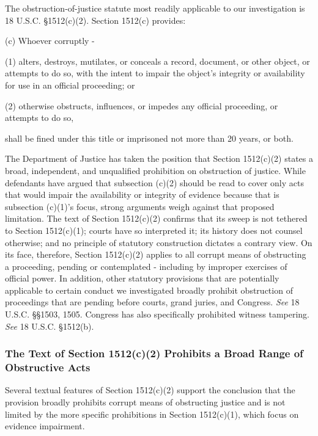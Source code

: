 The obstruction-of-justice statute most readily applicable to our investigation is 18 U.S.C. \S 1512(c)(2). Section 1512(c) provides:

(c) Whoever corruptly -

(1) alters, destroys, mutilates, or conceals a record, document, or other object, or attempts to do so, with the intent to impair the object’s integrity or availability for use in an official proceeding; or

(2) otherwise obstructs, influences, or impedes any official proceeding, or attempts to do so,

shall be fined under this title or imprisoned not more than 20 years, or both.

The Department of Justice has taken the position that Section 1512(c)(2) states a broad, independent, and unqualified prohibition on obstruction of justice.%
While defendants have argued that subsection (c)(2) should be read to cover only acts that would impair the availability or integrity of evidence because that is subsection (c)(1)’s focus, strong arguments weigh against that proposed limitation.
The text of Section 1512(c)(2) confirms that its sweep is not tethered to Section 1512(c)(1); courts have so interpreted it; its history does not counsel otherwise; and no principle of statutory construction dictates a contrary view.
On its face, therefore, Section 1512(c)(2) applies to all corrupt means of obstructing a proceeding, pending or contemplated - including by improper exercises of official power.
In addition, other statutory provisions that are potentially applicable to certain conduct we investigated broadly prohibit obstruction of proceedings that are pending before courts, grand juries, and Congress.
\textit{See} 18 U.S.C. \S\S 1503, 1505.
Congress has also specifically prohibited witness tampering.
\textit{See} 18 U.S.C. \S 1512(b).

\subsubsection{The Text of Section 1512(c)(2) Prohibits a Broad Range of Obstructive Acts}

Several textual features of Section 1512(c)(2) support the conclusion that the provision broadly prohibits corrupt means of obstructing justice and is not limited by the more specific prohibitions in Section 1512(c)(1), which focus on evidence impairment.

